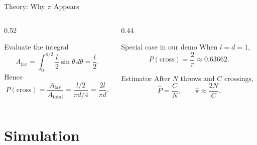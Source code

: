 \documentclass[aspectratio=169]{beamer}
\begin{document}
\begin{frame}{Theory: Why \texorpdfstring{$\pi$}{pi} Appears}
  \begin{columns}[T]
    \begin{column}{0.52\textwidth}
      \begin{block}{Evaluate the integral}
        \[
          A_{\text{fav}}
          =
          \int_0^{\pi/2}\frac{l}{2}\sin\theta\,d\theta
          =
          \frac{l}{2}.
        \]
        Hence
        \[
          P(\text{cross})
          =
          \frac{A_{\text{fav}}}{A_{\text{total}}}
          =
          \frac{l/2}{\pi d/4}
          =
          \frac{2l}{\pi d}.
        \]
      \end{block}
    \end{column}
    \begin{column}{0.44\textwidth}
      \begin{alertblock}{Special case in our demo}
        When $l=d=1$,
        \[
          P(\text{cross}) = \frac{2}{\pi} \approx 0.63662.
        \]
      \end{alertblock}
      \begin{exampleblock}{Estimator}
        After $N$ throws and $C$ crossings,
        \[
          \hat{P} = \frac{C}{N},
          \qquad
          \hat{\pi} \approx \frac{2N}{C}.
        \]
      \end{exampleblock}
    \end{column}
  \end{columns}
\end{frame}

\section{Simulation}
\end{document}
